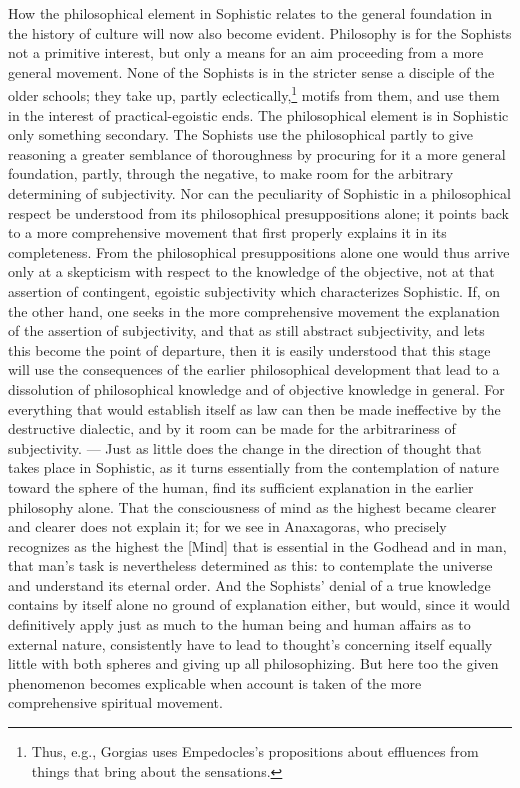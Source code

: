 How the philosophical element in Sophistic relates to the general foundation
in the history of culture will now also become evident. Philosophy is for the
Sophists not a primitive interest, but only a means for an aim proceeding
from a more general movement. None of the Sophists is in the stricter sense a
disciple of the older schools; they take up, partly
eclectically,\footnote{Thus, e.g., Gorgias uses Empedocles's propositions
about effluences from things that bring about the sensations.} motifs from
them, and use them in the interest of practical-egoistic ends. The
philosophical element is in Sophistic only something secondary. The Sophists
use the philosophical partly to give reasoning a greater semblance of
thoroughness by procuring for it a more general foundation, partly, through
the negative, to make room for the arbitrary determining of subjectivity.
Nor can the peculiarity of Sophistic in a philosophical respect be understood
from its philosophical presuppositions alone; it points back to a more
comprehensive movement that first properly explains it in its completeness.
From the philosophical presuppositions alone one would thus arrive only at a
skepticism with respect to the knowledge of the objective, not at that
assertion of contingent, egoistic subjectivity which characterizes Sophistic.
If, on the other hand, one seeks in the more comprehensive movement the
explanation of the assertion of subjectivity, and that as still abstract
subjectivity, and lets this become the point of departure, then it is easily
understood that this stage will use the consequences of the earlier
philosophical development that lead to a dissolution of philosophical
knowledge and of objective knowledge in general. For everything that would
establish itself as law can then be made ineffective by the destructive
dialectic, and by it room can be made for the arbitrariness of subjectivity.
--- Just as little does the change in the direction of thought that takes
place in Sophistic, as it turns essentially from the contemplation of nature
toward the sphere of the human, find its sufficient explanation in the
earlier philosophy alone. That the consciousness of mind as the highest
became clearer and clearer does not explain it; for we see in Anaxagoras, who
precisely recognizes as the highest the  [Mind] that is essential in
the Godhead and in man, that man's task is nevertheless determined as this:
to contemplate the universe and understand its eternal order. And the
Sophists' denial of a true knowledge contains by itself alone no ground of
explanation either, but would, since it would definitively apply just as much
to the human being and human affairs as to external nature,
consistently have to lead to thought's concerning itself equally little with
both spheres and giving up all philosophizing. But here too the given
phenomenon becomes explicable when account is taken of the more comprehensive
spiritual movement.

